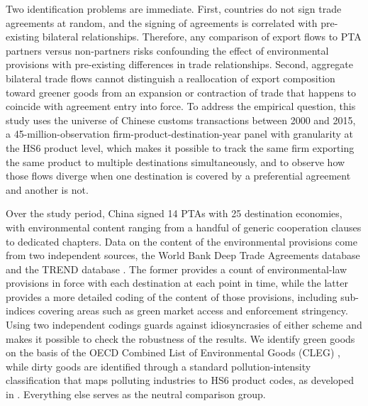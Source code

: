 \documentclass[12pt]{article}
\begin{document}
Two identification problems are immediate. First, countries do not sign trade agreements at random, and the signing of agreements is correlated with pre-existing bilateral relationships. Therefore, any comparison of export flows to PTA partners versus non-partners risks confounding the effect of environmental provisions with pre-existing differences in trade relationships. Second, aggregate bilateral trade flows cannot distinguish a reallocation of export composition toward greener goods from an expansion or contraction of trade that happens to coincide with agreement entry into force. To address the empirical question, this study uses the universe of Chinese customs transactions between 2000 and 2015, a 45-million-observation firm-product-destination-year panel with granularity at the HS6 product level, which makes it possible to track the same firm exporting the same product to multiple destinations simultaneously, and to observe how those flows diverge when one destination is covered by a preferential agreement and another is not.

Over the study period, China signed 14 PTAs with 25 destination economies, with environmental content ranging from a handful of generic cooperation clauses to dedicated chapters. Data on the content of the environmental provisions come from two independent sources, the World Bank Deep Trade Agreements database \citep{hofmann2017} and the TREND database \citep{morin2017}. The former provides a count of environmental-law provisions in force with each destination at each point in time, while the latter provides a more detailed coding of the content of those provisions, including sub-indices covering areas such as green market access and enforcement stringency. Using two independent codings guards against idiosyncrasies of either scheme and makes it possible to check the robustness of the results. We identify green goods on the basis of the OECD Combined List of Environmental Goods (CLEG) \citep{sauvage2014}, while dirty goods are identified through a standard pollution-intensity classification that maps polluting industries to HS6 product codes, as developed in \cite{mani1998}. Everything else serves as the neutral comparison group.
\end{document}
